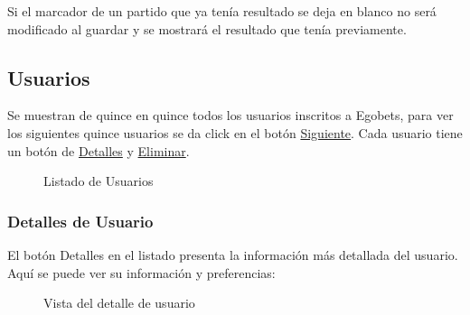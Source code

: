 Si el marcador de un partido que ya tenía resultado se deja en blanco no será modificado al guardar y se mostrará el resultado que tenía previamente.

\subsection{Usuarios}

Se muestran de quince en quince todos los usuarios inscritos a Egobets, para ver los siguientes quince usuarios se da click en el botón \underline{Siguiente}. Cada usuario tiene un botón de \underline{Detalles} y \underline{Eliminar}.
\begin{figure}[!htb]\centering
   \begin {minipage}{1\textwidth}
     \caption{Listado de Usuarios}
	 \label{Fig:usuarios}
   \end{minipage}
\end{figure}

\subsubsection{Detalles de Usuario}

El botón Detalles en el listado presenta la información más detallada del usuario. Aquí se puede ver su información y preferencias:

\begin{figure}[!htb]\centering
   \begin {minipage}{1\textwidth}
     \caption{Vista del detalle de usuario}
	 \label{Fig:Detalle-usuario}
   \end{minipage}
\end{figure}

